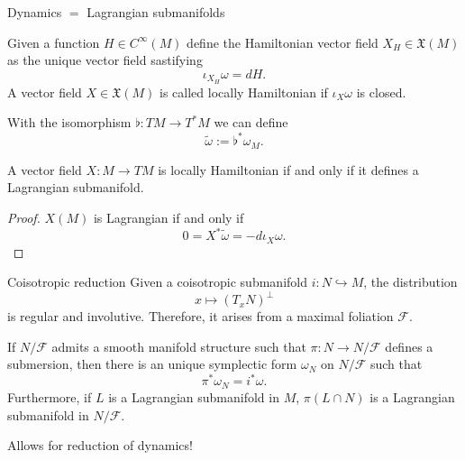 \begin{frame}{Dynamics $=$ Lagrangian submanifolds}
    \begin{definition} Given a function $H \in C^\infty(M)$ define the \alert{Hamiltonian vector field} $X_H \in \mathfrak{X}(M)$ as the unique vector field sastifying $$\iota_{X_H}\omega = dH.$$ A vector field $X \in \mathfrak{X}(M)$ is called \alert{locally Hamiltonian} if $\iota_X \omega$ is closed.
\end{definition}
\pause
With the isomorphism $\flat: TM \rightarrow T^\ast M$ we can define $$\widetilde \omega := \flat ^\ast \omega_M.$$
\begin{theorem} A vector field $X: M \rightarrow TM$ is locally Hamiltonian if and only if it defines a Lagrangian submanifold.
\end{theorem}
\begin{proof} $X(M)$ is Lagrangian if and only if $$0 = X^\ast \widetilde \omega = -d \iota_X \omega.$$
\end{proof}
\end{frame}

\begin{frame}{Coisotropic reduction}
Given a coisotropic submanifold $i:N \hookrightarrow M$, the distribution $$x \mapsto (T_x N)^\perp$$ is regular and involutive. Therefore, it arises from a maximal foliation $\mathcal{F}$.
\pause
\begin{theorem} If $N/\mathcal{F}$ admits a smooth manifold structure such that $\pi: N \rightarrow N/\mathcal{F}$ defines a submersion, then there is an unique symplectic form $\omega_N$ on $N/\mathcal{F}$ such that $$\pi^\ast \omega_N = i^\ast \omega.$$ \alert{Furthermore, if $L$ is a Lagrangian submanifold in $M$, $\pi(L \cap N)$ is a Lagrangian submanifold in $N/\mathcal{F}.$} 
\end{theorem}

Allows for reduction of dynamics!
\end{frame}

